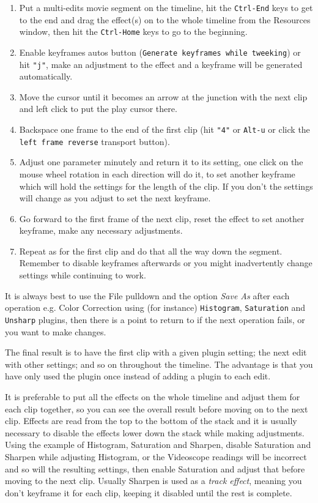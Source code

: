 \begin{enumerate}
	\item Put a multi-edits movie segment on the timeline, hit the \texttt{Ctrl-End} keys to get to the end and drag the effect(s) on to the whole timeline from the Resources window, then hit the \texttt{Ctrl-Home} keys to go to the beginning.
	\item Enable keyframes autos button (\texttt{Generate keyframes while tweeking}) or hit \texttt{"j"}, make an adjustment to the effect and a keyframe will be generated automatically.
	\item Move the cursor until it becomes an arrow at the junction with the next clip and left click to put the play cursor there.
	\item Backspace one frame to the end of the first clip (hit \texttt{"4"} or \texttt{Alt-u} or click the \texttt{left frame reverse} transport button).
	\item Adjust one parameter minutely and return it to its setting, one click on the mouse wheel rotation in each direction will do it, to set another keyframe which will hold the settings for the length of the clip. If you don't the settings will change as you adjust to set the next keyframe.
	\item Go forward to the first frame of the next clip, reset the effect to set another keyframe, make any necessary adjustments.
	\item Repeat as for the first clip and do that all the way down the segment. Remember to disable keyframes afterwards or you might inadvertently change settings while continuing to work.
\end{enumerate}

It is always best to use the File pulldown and the option \textit{Save As} after each operation e.g. Color Correction using (for instance) \texttt{Histogram}, \texttt{Saturation} and \texttt{Unsharp} plugins, then there is a point to return to if the next operation fails, or you want to make changes.

The final result is to have the first clip with a given plugin setting; the next edit with other settings; and so on throughout the timeline. The advantage is that you have only used the plugin once instead of adding a plugin to each edit.

It is preferable to put all the effects on the whole timeline and adjust them for each clip together, so you can see the overall result before moving on to the next clip. Effects are read from the top to the bottom of the stack and it is usually necessary to disable the effects lower down the stack while making adjustments. Using the example of Histogram, Saturation and Sharpen, disable Saturation and Sharpen while adjusting Histogram, or the Videoscope readings will be incorrect and so will the resulting settings, then enable Saturation and adjust that before moving to the next clip. Usually Sharpen is used as a \textit{track effect}, meaning you don't keyframe it for each clip, keeping it disabled until the rest is complete.

